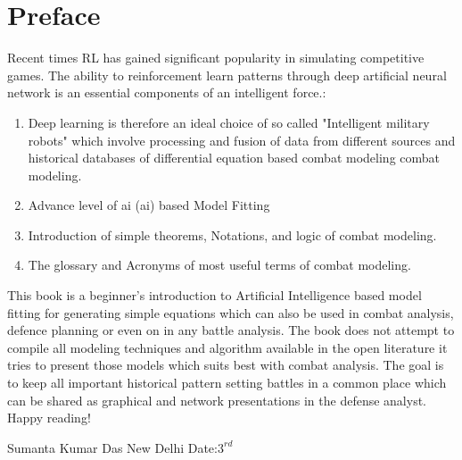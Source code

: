 \documentclass[]{article}
\begin{document}
\section*{Preface}
\justifying
Recent times RL has gained significant popularity in simulating competitive games. The ability to reinforcement learn patterns through  deep artificial neural network is an essential components of an  intelligent force.:
\begin{enumerate}
    \item Deep learning is therefore an ideal choice of so called "Intelligent military robots" which involve processing and fusion of data from different sources and historical databases of differential equation based combat modeling \Gls{combat modeling}.
    \item Advance level of \acrlong{ai} (\acrshort{ai}) based Model Fitting
    \item Introduction of simple theorems, Notations, and logic of combat modeling.
    \item The glossary and Acronyms of most useful terms of combat modeling.
\end{enumerate}
This book is a beginner’s introduction to \Gls{Artificial Intelligence} based model fitting for generating simple equations which can also be used in combat analysis, defence planning or even on in any battle analysis. The book does not attempt to compile all modeling techniques and algorithm available in the open literature it tries to present those models which suits best with combat analysis. The goal is to keep all important historical pattern setting battles in a common place which can be shared as graphical and network presentations in the defense analyst.
\newline
Happy reading!\newline


\RaggedLeft    
Sumanta Kumar Das\newline
New Delhi\newline
Date:$3^{rd}$ 
\newpage
\end{document}
